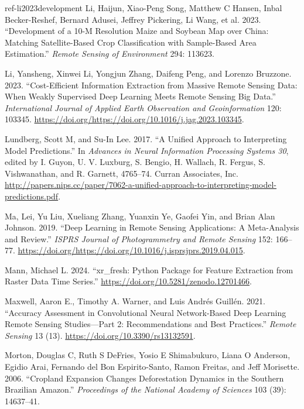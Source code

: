 \documentclass[
  journal,
  twocolumn]{IEEEtran}
\newlength{\cslhangindent}
\newlength{\cslentryspacingunit} %
\newenvironment{CSLReferences}[2] %
 {%
  \setlength{\parindent}{0pt}
  \ifodd #1
  \let\oldpar\par
  \def\par{\hangindent=\cslhangindent\oldpar}
  \fi
  \setlength{\parskip}{#2\cslentryspacingunit}
 }%
 {}
\newenvironment{cslreferences}[2]
 {\begin{CSLReferences}{#1}{#2}}
 {\end{CSLReferences}}
\begin{document}
\begin{cslreferences}
\leavevmode\hypertarget{ref-li2023development}{}%
Li, Haijun, Xiao-Peng Song, Matthew C Hansen, Inbal Becker-Reshef,
Bernard Adusei, Jeffrey Pickering, Li Wang, et al. 2023. ``Development
of a 10-M Resolution Maize and Soybean Map over China: Matching
Satellite-Based Crop Classification with Sample-Based Area Estimation.''
\emph{Remote Sensing of Environment} 294: 113623.

\leavevmode\hypertarget{ref-LI2023103345}{}%
Li, Yansheng, Xinwei Li, Yongjun Zhang, Daifeng Peng, and Lorenzo
Bruzzone. 2023. ``Cost-Efficient Information Extraction from Massive
Remote Sensing Data: When Weakly Supervised Deep Learning Meets Remote
Sensing Big Data.'' \emph{International Journal of Applied Earth
Observation and Geoinformation} 120: 103345.
\url{https://doi.org/https://doi.org/10.1016/j.jag.2023.103345}.

\leavevmode\hypertarget{ref-shaps_2017}{}%
Lundberg, Scott M, and Su-In Lee. 2017. ``A Unified Approach to
Interpreting Model Predictions.'' In \emph{Advances in Neural
Information Processing Systems 30}, edited by I. Guyon, U. V. Luxburg,
S. Bengio, H. Wallach, R. Fergus, S. Vishwanathan, and R. Garnett,
4765--74. Curran Associates, Inc.
\url{http://papers.nips.cc/paper/7062-a-unified-approach-to-interpreting-model-predictions.pdf}.

\leavevmode\hypertarget{ref-MA2019166}{}%
Ma, Lei, Yu Liu, Xueliang Zhang, Yuanxin Ye, Gaofei Yin, and Brian Alan
Johnson. 2019. ``Deep Learning in Remote Sensing Applications: A
Meta-Analysis and Review.'' \emph{ISPRS Journal of Photogrammetry and
Remote Sensing} 152: 166--77.
\url{https://doi.org/https://doi.org/10.1016/j.isprsjprs.2019.04.015}.

\leavevmode\hypertarget{ref-xr_fresh_2021}{}%
Mann, Michael L. 2024. ``xr\_fresh: Python Package for Feature
Extraction from Raster Data Time Series.''
\url{https://doi.org/10.5281/zenodo.12701466}.

\leavevmode\hypertarget{ref-rs13132591}{}%
Maxwell, Aaron E., Timothy A. Warner, and Luis Andrés Guillén. 2021.
``Accuracy Assessment in Convolutional Neural Network-Based Deep
Learning Remote Sensing Studies---Part 2: Recommendations and Best
Practices.'' \emph{Remote Sensing} 13 (13).
\url{https://doi.org/10.3390/rs13132591}.

\leavevmode\hypertarget{ref-morton2006cropland}{}%
Morton, Douglas C, Ruth S DeFries, Yosio E Shimabukuro, Liana O
Anderson, Egidio Arai, Fernando del Bon Espirito-Santo, Ramon Freitas,
and Jeff Morisette. 2006. ``Cropland Expansion Changes Deforestation
Dynamics in the Southern Brazilian Amazon.'' \emph{Proceedings of the
National Academy of Sciences} 103 (39): 14637--41.


\end{cslreferences}
\end{document}

